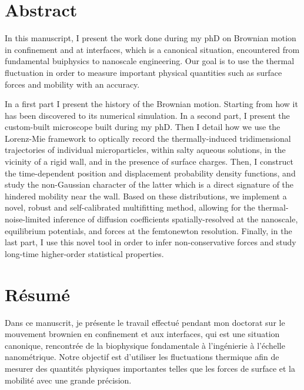 \section*{Abstract}

In this manuscript, I present the work done during my phD on Brownian motion in confinement and at interfaces, which is a canonical situation, encountered from fundamental buiphysics to nanoscale engineering. Our goal is to use the thermal fluctuation in order to measure important physical quantities such as surface forces and mobility with an accuracy.

In a first part I present the history of the Brownian motion. Starting from how it has been discovered to its numerical simulation. In a second part, I present the custom-built microscope built during my phD. Then I detail how we use the Lorenz-Mie framework to optically record the thermally-induced tridimensional trajectories of individual microparticles, within salty aqueous solutions, in the vicinity of a rigid wall, and in the presence of surface charges. Then, I construct the time-dependent position and displacement probability density functions, and study the non-Gaussian character of the latter which is a direct signature of the hindered mobility near the wall. Based on these distributions, we implement a novel, robust and self-calibrated multifitting method, allowing for the thermal-noise-limited inference of diffusion coefficients spatially-resolved at the nanoscale, equilibrium potentials, and forces at the femtonewton resolution. Finally, in the last part, I use this novel tool in order to infer non-conservative forces and study long-time higher-order statistical properties.


\section*{Résumé}

Dans ce manuscrit, je présente le travail effectué pendant mon doctorat sur le mouvement brownien en confinement et aux interfaces, qui est une situation canonique, rencontrée de la biophysique fondamentale à l'ingénierie à l'échelle nanométrique.  Notre objectif est d'utiliser les fluctuations thermique afin de mesurer des quantités physiques importantes telles que les forces de surface et la mobilité avec une grande précision.


